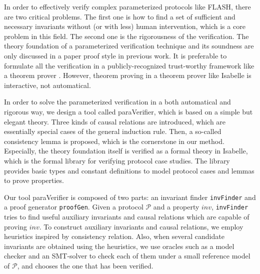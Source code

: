 \documentclass{llncs}
\newcommand\cai[1]{\textcolor{blue}{ #1} }
\begin{document}
In order to effectively verify complex parameterized protocols like FLASH, there are two critical problems. %
The first one is  how to find a set of sufficient and necessary invariants without (or with less) human intervention, which is a core problem in this field. %
The second one is the rigorousness  of the verification. The theory foundation of a parameterized verification technique and its soundness are only discussed in a paper proof style in previous work.  %
It is preferable to formulate all the verification in a publicly-recognized trust-worthy framework like a theorem prover \cite{Chou2004}. However,
 theorem proving in a theorem prover like Isabelle is   interactive, not automatical.


In order to solve the parameterized
verification %
 in a both automatical and rigorous way, we design a tool called {\sf paraVerifier}, which is based on a simple but elegant theory.  Three kinds of causal
relations are introduced, which are
essentially special cases of the general induction rule. Then, a
so-called consistency lemma is proposed, which is the cornerstone in
our method. Especially, the theory foundation itself is  verified as a
formal theory in Isabelle, which is the formal library for verifying protocol case studies. The library provides basic types and constant definitions to model protocol cases and lemmas to prove  properties. %

Our tool {\sf paraVerifier} is composed of two parts:  an invariant finder {\tt invFinder}
and a proof generator {\tt proofGen}. %
Given a protocol $\mathcal{P}$ and a property $inv$, {\tt invFinder} tries to find useful auxiliary invariants and causal relations which are capable of proving $inv$. To construct auxiliary invariants and causal relations, we employ heuristics inspired by consistency relation. Also, when several candidate invariants are obtained using the heuristics, we use oracles such as a model checker and an SMT-solver to check each of them under a small reference model of $\mathcal{P}$, and chooses the one that has been verified.
\end{document}
